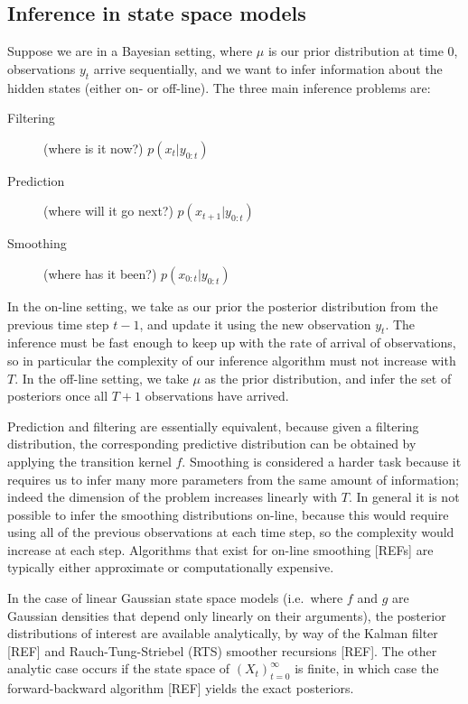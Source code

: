 \documentclass[fleqn]{article}
\begin{document}
\subsection{Inference in state space models}
Suppose we are in a Bayesian setting, where $\mu$ is our prior distribution at time 0, observations $y_t$ arrive sequentially, and we want to infer information about the hidden states (either on- or off-line).
The three main inference problems are:
\begin{description}
\item[Filtering] (where is it now?) $p(x_{t} | y_{0:t})$
\item[Prediction] (where will it go next?) $p(x_{t+1} | y_{0:t})$
\item[Smoothing] (where has it been?) $p(x_{0:t} | y_{0:t})$
\end{description}
In the on-line setting, we take as our prior the posterior distribution from the previous time step $t-1$, and update it using the new observation $y_t$. The inference must be fast enough to keep up with the rate of arrival of observations, so in particular the complexity of our inference algorithm must not increase with $T$.
In the off-line setting, we take $\mu$ as the prior distribution, and infer the set of posteriors once all $T+1$ observations have arrived.

Prediction and filtering are essentially equivalent, because given a filtering distribution, the corresponding predictive distribution can be obtained by applying the transition kernel $f$.
Smoothing is considered a harder task because it requires us to infer many more parameters from the same amount of information; indeed the dimension of the problem increases linearly with $T$.
In general it is not possible to infer the smoothing distributions on-line, because this would require using all of the previous observations at each time step, so the complexity would increase at each step. Algorithms that exist for on-line smoothing [REFs] are typically either approximate or computationally expensive.

In the case of linear Gaussian state space models (i.e.\ where $f$ and $g$ are Gaussian densities that depend only linearly on their arguments), the posterior distributions of interest are available analytically, by way of the Kalman filter [REF] and Rauch-Tung-Striebel (RTS) smoother recursions [REF].
The other analytic case occurs if the state space of $(X_t)_{t=0}^\infty$ is finite, in which case the forward-backward algorithm [REF] yields the exact posteriors.
\end{document}
